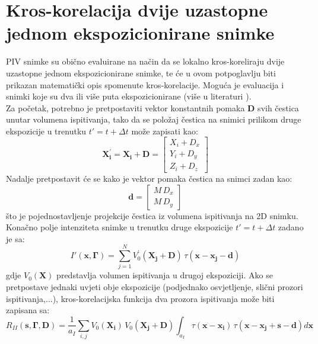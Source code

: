 \section{Kros-korelacija dvije uzastopne jednom ekspozicionirane snimke}
PIV snimke su obično evaluirane na način da se lokalno kros-koreliraju dvije uzastopne jednom ekspozicionirane snimke, te će u ovom potpoglavlju biti prikazan matematički opis spomenute kros-korelacije. Moguća je evaluacija i snimki koje su dva ili više puta ekspozicionirane (više u literaturi \cite{raffel2018_book}).\\
Za početak, potrebno je pretpostaviti vektor konstantnih pomaka $\boldsymbol{D}$ svih čestica unutar volumena ispitivanja, tako da se položaj čestica na snimici prilikom druge ekspozicije u trenutku $t' = t + \Delta t$ može zapisati kao:
\begin{equation}
	\boldsymbol{X_{i}^{'}}=\boldsymbol{X_{i}}+\boldsymbol{D}=\left[ \begin{array}{c}
																		X_{i}+D_{x} \\
																		Y_{i}+D_{y} \\
																		Z_{i}+D_{z}
																	\end{array} \right]
	\label{eqn:3.23}
\end{equation}
Nadalje pretpostavit će se kako je vektor pomaka čestica na snimci zadan kao:
\begin{equation}
	\boldsymbol{d}=\left[\begin{array}{c}
							M \, D_{x}\\
							M \, D_{y}
						\end{array}\right]
	\label{eqn:3.24}
\end{equation} 
što je pojednostavljenje projekcije čestica iz volumena ispitivanja na 2D snimku.\\
Konačno polje intenziteta snimke u trenutku druge ekspozicije $t' = t + \Delta t$ zadano je sa:
\begin{equation}
	I'(\boldsymbol{x}, \boldsymbol{\Gamma}) = \sum_{j=1}^{N}V_{0}^{'}(\boldsymbol{X_{j}}+\boldsymbol{D})\, \tau(\boldsymbol{x}-\boldsymbol{x_{j}}-\boldsymbol{d})
	\label{eqn:3.25}
\end{equation}
gdje $V_{0}(\boldsymbol{X})$ predstavlja volumen ispitivanja u drugoj ekspoziciji.
Ako se pretpostave jednaki uvjeti obje ekspozicije (podjednako osvjetljenje, slični prozori ispitivanja,...), kros-korelacijska funkcija dva prozora ispitivanja može biti zapisana sa:
\begin{equation}
	R_{II}(\boldsymbol{s}, \boldsymbol{\Gamma}, \boldsymbol{D}) = \dfrac{1}{a_{I}}\sum_{i,j}V_{0}(\boldsymbol{X_{i}})\, V_{0}(\boldsymbol{X_{j}}+\boldsymbol{D}) \int_{a_{I}}\tau (\boldsymbol{x}-\boldsymbol{x_{i}})\, \tau (\boldsymbol{x}-\boldsymbol{x_{j}}+\boldsymbol{s}-\boldsymbol{d})d\boldsymbol{x}
	\label{eqn:3.26}
\end{equation}

